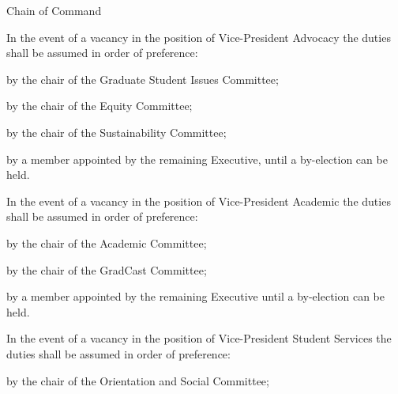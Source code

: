 \begin{longenum}[ label*=\thesubsection.\arabic*., align=left]
	\item Chain of Command 
		\begin{longenum}[ label*=\arabic*., align=left]
			\item In the event of a vacancy in the position of Vice-President Advocacy the duties shall be assumed in order of preference:
			\begin{longenum}[ label*=\arabic*., align=left]
				\item by the chair of the Graduate Student Issues Committee;
				\item by the chair of the Equity Committee;
                \item by the chair of the Sustainability Committee;
				\item by a member appointed by the remaining Executive, until a by-election can be held.
			\end{longenum}
			\item In the event of a vacancy in the position of Vice-President Academic the duties shall be assumed in order of preference:
			\begin{longenum}[ label*=\arabic*., align=left]
				\item by the chair of the Academic Committee;
				\item by the chair of the GradCast Committee;
				\item by a member appointed by the remaining Executive until a by-election can be held.
			\end{longenum}
			\item In the event of a vacancy in the position of Vice-President Student Services the duties shall be assumed in order of preference: 
			\begin{longenum}[ label*=\arabic*., align=left]
				\item by the chair of the Orientation and Social Committee;

\end{longenum}
\end{longenum}
\end{longenum}
